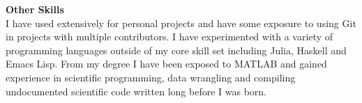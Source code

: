 \textbf{Other Skills}\\
I have used  extensively for personal projects and have some exposure
to using Git in projects with multiple contributors. I have experimented with a
variety of programming languages outside of my core skill set including Julia,
Haskell and Emacs Lisp. From my degree I have been exposed to MATLAB and gained
experience in scientific  programming, data wrangling and
compiling undocumented scientific code written long before I was born.

